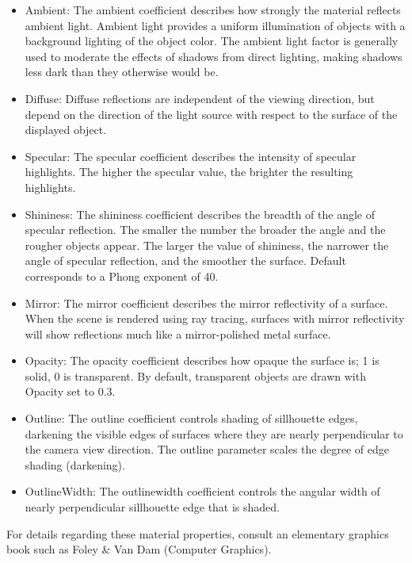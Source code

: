 \begin{itemize}
\item Ambient: The ambient coefficient describes how strongly the 
            material reflects ambient light.  Ambient light
            provides a uniform illumination of objects with a
            background lighting of the object color.  The ambient light
            factor is generally used to moderate the effects of 
            shadows from direct lighting, making shadows less dark than
            they otherwise would be.
\item Diffuse: Diffuse reflections are independent of the viewing
            direction, but depend on the direction of the light source
            with respect to the surface of the displayed object.
\item Specular: The specular coefficient describes the intensity of
            specular highlights.  The higher the specular value, 
            the brighter the resulting highlights.
\item Shininess: The shininess coefficient describes the breadth of
            the angle of specular reflection. The smaller the number the
            broader the angle and the rougher objects appear.  The larger
            the value of shininess, the narrower the angle of specular
            reflection, and the smoother the surface.
            Default corresponds to a Phong exponent of 40.
\item Mirror: The mirror coefficient describes the mirror
            reflectivity of a surface.  When the scene is rendered using
            ray tracing, surfaces with mirror reflectivity will show 
            reflections much like a mirror-polished metal surface.
\item Opacity: The opacity coefficient describes how opaque the surface is;
            1 is solid, 0 is transparent. By default, transparent objects 
	    are drawn with Opacity set to 0.3.
\item Outline: The outline coefficient controls shading of sillhouette edges,
            darkening the visible edges of surfaces where they are nearly 
            perpendicular to the camera view direction.  The outline parameter
            scales the degree of edge shading (darkening).
\item OutlineWidth: The outlinewidth coefficient controls the angular width of
            nearly perpendicular sillhouette edge that is shaded.
\end{itemize}
For details regarding these material properties, consult an elementary
graphics book such as Foley \& Van Dam (Computer Graphics).  

